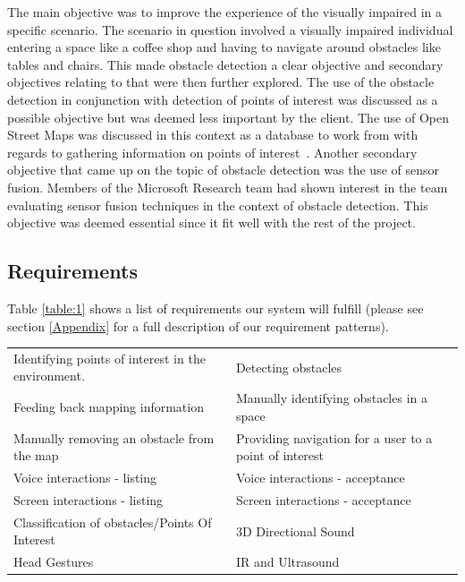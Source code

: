 \documentclass[prodmode,acmtosem]{acmsmall} %
\begin{document}
The main objective was to improve the experience of the visually impaired in a specific scenario. The scenario in question involved a visually impaired individual entering a space like a coffee shop and having to navigate around obstacles like tables and chairs.
This made obstacle detection a clear objective and secondary objectives relating to that were then further explored. The use of the obstacle detection in conjunction with detection of points of interest was discussed as a possible objective but was deemed less important by the client.
The use of Open Street Maps was discussed in this context as a database to work from with regards to gathering information on points of interest~\cite{OSM}.
Another secondary objective that came up on the topic of obstacle detection was the use of sensor fusion. Members of the Microsoft Research team had shown interest in the team evaluating sensor fusion techniques in the context of obstacle detection. This objective was deemed essential since it fit well with the rest of the project.



\subsection{Requirements}

Table \ref{table:1} shows a list of requirements our system will fulfill (please see section \ref{Appendix} for a full description of our requirement patterns).\\

\renewcommand{\arraystretch}{1.5}

\begin{center}
\begin{tabularx}{\textwidth}{| X | X |} 
 \hline
 \rowcolor{lightgray}
 \multicolumn{2}{|c|}{List of Requirements} \\ [0.5ex] 
 \hline\hline
 Identifying points of interest in the environment. &  Detecting obstacles \\
 \hline
 Feeding back mapping information &  Manually identifying obstacles in a space \\
 \hline
 Manually removing an obstacle from the map &  Providing navigation for a user to a point of interest \\ 
 \hline
 Voice interactions - listing &  Voice interactions - acceptance \\ 
 \hline
 Screen interactions - listing &  Screen interactions - acceptance \\ 
 \hline
 Classification of obstacles/Points Of Interest &  3D Directional Sound \\ 
 \hline
 Head Gestures &  IR and Ultrasound \\  
 \hline

 \hline
\end{tabularx}
\label{tab:requirements}
\end{center}
\end{document}
